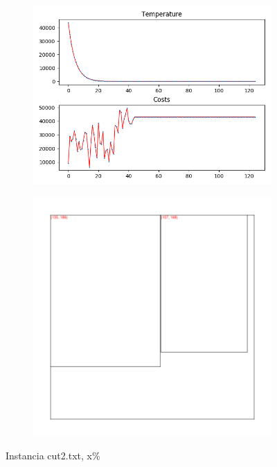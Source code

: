 \begin{figure}
\centering
\begin{subfigure}{.5\textwidth}
  \centering
  \includegraphics[width=1\linewidth]{results/cut2/1/plot}
  \label{fig:sub1}
\end{subfigure}%
\begin{subfigure}{.5\textwidth}
  \centering
  \includegraphics[width=1\linewidth]{results/cut2/1/cut}
  \label{fig:sub2}
\end{subfigure}
\caption{Instancia cut2.txt, x\%}
\label{fig:test}
\end{figure}


